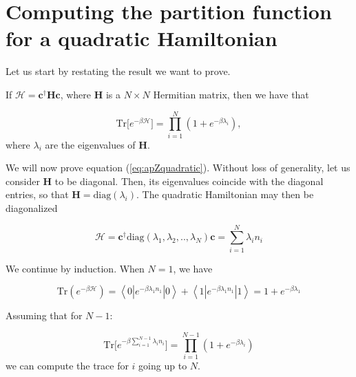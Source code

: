 \section{Computing the partition function for a quadratic Hamiltonian}
\label{sec:Zquadratic}

Let us start by restating the result we want to prove.

If $\mathcal{H} = \bm c^\dagger \bm H \bm c$, where $\bm H$ is a $N \times N$ Hermitian matrix, then we have that

\begin{equation}\label{eq:apZquadratic}
\text{Tr} \big[ e^{-\beta \mathcal{H} } \big] = \prod_{i=1}^N ( 1 + e^{-\beta \lambda_{i} } ) ,
\end{equation}
where $\lambda_{i}$ are the eigenvalues of $\bm H$. 

We will now prove equation (\ref{eq:apZquadratic}). Without loss of generality, let us consider $\bm H$ to be diagonal. Then, its eigenvalues coincide with the diagonal entries, so that $\bm H = \text{diag}(\lambda_{i} )$. The quadratic Hamiltonian may then be  diagonalized

\begin{equation*}
\mathcal{H} = {\bm c}^\dagger \text{diag} (\lambda_{1}, \lambda_{2}, .., \lambda_{N}) \bm c = \sum_{i=1}^N \lambda_{i} n_{i}
\end{equation*}

We continue by induction. When $N=1$, we have

\begin{equation}
\text{Tr} (e^{-\beta\mathcal{H} } ) = \left\langle 0 \left| e^{-\beta \lambda_{1} n_{1}}  \right| 0 \right\rangle + \left\langle 1 \left| e^{-\beta \lambda_{1} n_{1}}   \right| 1 \right\rangle = 1 + e^{-\beta \lambda_{1} }
\end{equation}

Assuming that for $N-1$:

\begin{equation*}
\text{Tr} \big[ e^{-\beta \sum_{i=1}^{N-1} \lambda_{i} n_{i} } \big] = \prod_{i=1}^{N-1} ( 1 + e^{-\beta \lambda_{i} } )
\end{equation*}
we can compute the trace for $i$ going up to $N$.


